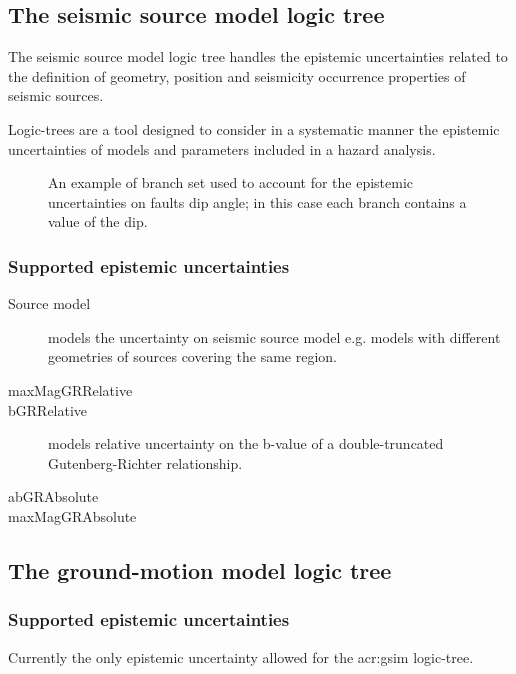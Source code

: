 \subsection{The seismic source model logic tree}
The seismic source model logic tree handles the epistemic uncertainties
related to the definition of geometry, position and seismicity occurrence 
properties of seismic sources. 

Logic-trees are a tool designed to consider in a systematic manner the 
epistemic uncertainties of models and parameters included in a hazard 
analysis.
\renewcommand{\psedge}{\ncdiag[armA=0,angleB=180,armB=1cm]}
\begin{figure}[!hb]
%
\caption{An example of branch set used to account for the epistemic 
uncertainties on faults dip angle; in this case each branch contains a value 
of the dip.}
\label{fig:logic_tree_branching_levels}
\end{figure}

%
\subsubsection{Supported epistemic uncertainties}

\begin{description}
\item [Source model] models the uncertainty on seismic source model e.g. models
with different geometries of sources covering the same region.
\item [maxMagGRRelative]
\item [bGRRelative] models relative uncertainty on the b-value of a
double-truncated Gutenberg-Richter relationship.
\item [abGRAbsolute]
\item [maxMagGRAbsolute]
\end{description}
%
\subsection{The ground-motion model logic tree}
%
\subsubsection{Supported epistemic uncertainties}
Currently the only epistemic uncertainty allowed for the \gls{acr:gsim}
logic-tree.
%
